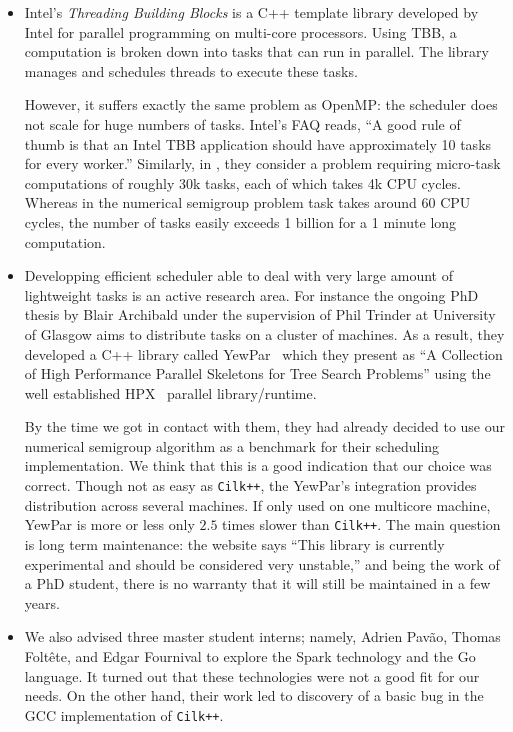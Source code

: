 \documentclass{deliverablereport}
\newcommand{\CilkP}{\texttt{Cilk++}\xspace}
\begin{document}
\begin{itemize}
  Unfortunately, for computations like numerical semigroups, there
  is a huge number of small tasks that are spawned. We used the implementation
  from the GCC compiler. At the time of our experiment, we found that the
  scheduler doesn't scale to this huge number of tasks required. The scheduling overhead
  was several order of magnitude larger than \CilkP making it unusable for
  these kinds of computations.

\item Intel's \emph{Threading Building Blocks} is a C++ template library
  developed by Intel for parallel programming on multi-core processors. Using
  TBB, a computation is broken down into tasks that can run in parallel. The
  library manages and schedules threads to execute these tasks.

  However, it suffers exactly the same problem as OpenMP: the scheduler
  does not scale for huge numbers of tasks. Intel's FAQ reads, ``A good rule of
  thumb is that an Intel TBB application should have approximately 10 tasks
  for every worker.'' Similarly, in \cite{LuLi}, they consider a problem
  requiring micro-task computations of roughly 30k tasks, each of which takes 4k
  CPU cycles. Whereas in the numerical semigroup problem task takes around 60
  CPU cycles, the number of tasks easily exceeds 1 billion for a 1 minute long
  computation.

\item Developping efficient scheduler able to deal with very large amount of
  lightweight tasks is an active research area. For instance the ongoing PhD
  thesis by Blair Archibald under the supervision of Phil Trinder at University
  of Glasgow aims to distribute tasks on a cluster
  of machines. As a result, they developed a C++ library called
  YewPar~\cite{YewPar} which they present as ``A Collection of High
  Performance Parallel Skeletons for Tree Search Problems'' using the well
  established HPX~\cite{HPX} parallel library/runtime.

  By the time we got in contact with them, they had already decided to use our numerical
  semigroup algorithm as a benchmark for their scheduling implementation. We
  think that this is a good indication that our choice was correct. Though not
  as easy as \CilkP, the YewPar's integration
  provides distribution across several machines. If only used on
  one multicore machine, YewPar is more or less only $2.5$ times slower than
  \CilkP. The main question is long term maintenance: the website says ``This
  library is currently experimental and should be considered very unstable,''
  and being the work of a PhD student, there is no warranty that it will
  still be maintained in a few years.

\item We also advised three master student interns; namely, Adrien Pavão,
  Thomas Foltête, and Edgar Fournival to explore the Spark technology and the
  Go language. It turned out that these technologies were not a good fit for our
  needs. On the other hand, their work led to discovery of a basic bug in the GCC
  implementation of \CilkP \cite{gcc-bug-80038}.
\end{itemize}
\end{document}
